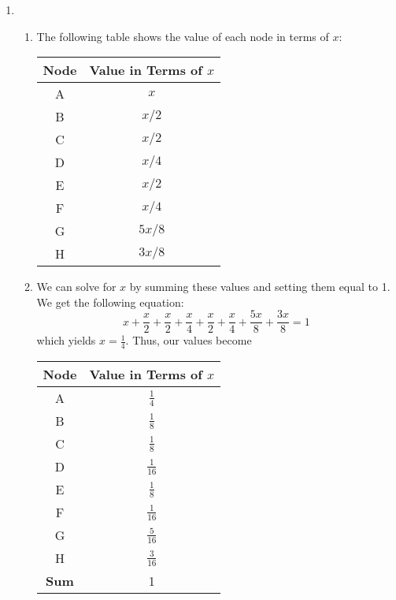 \documentclass{article}
\begin{document}
\begin{enumerate}
    \pagebreak

    \item \begin{enumerate}
        \item The following table shows the value of each node in terms of $x$:
        \begin{center}\begin{tabular}{||c | c||} 
            \hline
            Node & Value in Terms of $x$ \\ [0.5ex] 
            \hline\hline
            A & $x$ \\
            \hline
            B & $x/2$ \\
            \hline
            C & $x/2$ \\
            \hline
            D & $x/4$ \\
            \hline
            E & $x/2$ \\
            \hline
            F & $x/4$ \\
            \hline
            G & $5x/8$ \\
            \hline
            H & $3x/8$ \\
            \hline
        \end{tabular}\end{center}

        \item We can solve for $x$ by summing these values and setting them equal to 1. We get the following equation:
        $$x + \frac{x}{2} + \frac{x}{2} + \frac{x}{4} + \frac{x}{2} + \frac{x}{4} + \frac{5x}{8} + \frac{3x}{8} = 1$$
        which yields $x=\frac{1}{4}$. Thus, our values become
        \begin{center}\begin{tabular}{||c | c||} 
            \hline
            Node & Value in Terms of $x$ \\ [0.5ex] 
            \hline\hline
            A & $\frac{1}{4}$ \\ [0.5ex]
            \hline
            B & $\frac{1}{8}$ \\ [0.5ex]
            \hline
            C & $\frac{1}{8}$ \\ [0.5ex]
            \hline
            D & $\frac{1}{16}$ \\ [0.5ex]
            \hline
            E & $\frac{1}{8}$ \\ [0.5ex]
            \hline
            F & $\frac{1}{16}$ \\ [0.5ex]
            \hline
            G & $\frac{5}{16}$ \\ [0.5ex]
            \hline
            H & $\frac{3}{16}$ \\ [0.5ex]
            \hline\hline
            \textbf{Sum} & 1 \\ [1ex] 
            \hline
        \end{tabular}\end{center}
    \end{enumerate}


\end{enumerate}
\end{document}
